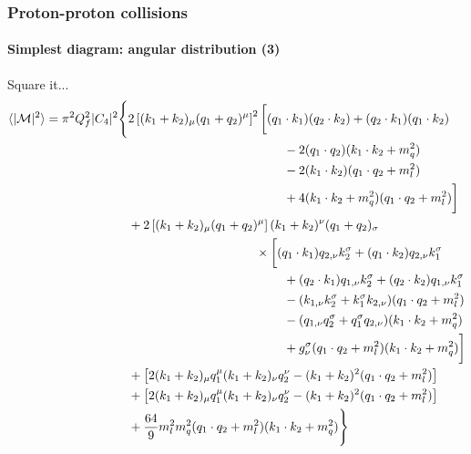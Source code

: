 \documentclass[10pt]{beamer}
\begin{document}
	\begin{frame}
		\frametitle{Proton-proton collisions}
		\framesubtitle{Simplest diagram: angular distribution (3)}
		Square it...
		\tiny\begin{align}
		\begin{split}
		\langle|\mathcal{M}|^2\rangle = \pi^2Q_f^2|C_4|^2\Bigg\{ &2\left[(k_1+k_2)_\mu(q_1+q_2)^\mu\right]^2\bigg[ (q_1\cdot k_1)(q_2\cdot k_2) +(q_2\cdot k_1)(q_1\cdot k_2)\\
		&\hspace{4.4cm}- 2(q_1\cdot q_2)(k_1\cdot k_2 + m_q^2) \\
		&\hspace{4.4cm}- 2(k_1\cdot k_2)(q_1\cdot q_2 + m_l^2)\\
		&\hspace{4.4cm} + 4(k_1\cdot k_2 + m_q^2)(q_1\cdot q_2 + m_l^2)\bigg]\\
		&+ 2\left[(k_1+k_2)_\mu(q_1+q_2)^\mu\right](k_1+k_2)^\nu(q_1+q_2)_\sigma\\
		&\hspace{3.6cm}\times\bigg[ (q_1\cdot k_1)q_{2,\nu}k_2^\sigma + (q_1\cdot k_2)q_{2,\nu}k_1^\sigma\\
		&\hspace{4.4cm}+(q_2\cdot k_1)q_{1,\nu}k_2^\sigma + (q_2\cdot k_2)q_{1,\nu}k_1^\sigma\\
		&\hspace{4.4cm} -(k_{1,\nu}k_2^\sigma + k_1^\sigma k_{2,\nu})(q_1\cdot q_2 + m_l^2)\\
		&\hspace{4.4cm} -(q_{1,\nu}q_2^\sigma + q_1^\sigma q_{2,\nu})(k_1\cdot k_2 + m_q^2)\\
		&\hspace{4.4cm} +g_\nu^\sigma(q_1\cdot q_2 + m_l^2)(k_1\cdot k_2 + m_q^2) \bigg]\\
		&+\left[2(k_1+k_2)_\mu q_1^\mu (k_1+k_2)_\nu q_2^\nu - (k_1+k_2)^2(q_1\cdot q_2 + m_l^2)\right]\\
		&+\left[2(k_1+k_2)_\mu q_1^\mu (k_1+k_2)_\nu q_2^\nu - (k_1+k_2)^2(q_1\cdot q_2 + m_l^2)\right]\\
		&+\frac{64}{9}m_l^2m_q^2(q_1\cdot q_2 + m_l^2)(k_1\cdot k_2 + m_q^2)\Bigg\}
		\end{split}
		\label{eq_ffs}
		\end{align}
		\normalsize
	\end{frame}
	
\end{document}
